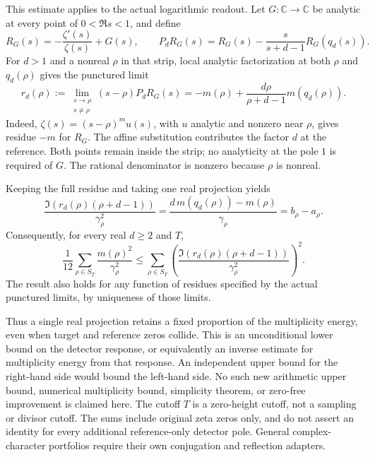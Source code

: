 This estimate applies to the actual logarithmic readout. Let
\(G:\mathbb C\to\mathbb C\) be analytic at every point of
\(0<\Re s<1\), and define
\[
 R_G(s)=-\frac{\zeta'(s)}{\zeta(s)}+G(s),\qquad
 P_dR_G(s)=R_G(s)-\frac{s}{s+d-1}R_G(q_d(s)).
\]
For \(d>1\) and a nonreal \(\rho\) in that strip, local analytic
factorization at both \(\rho\) and \(q_d(\rho)\) gives the punctured limit
\begin{equation}\label{eq:canonical-power-multiplicity-residue}
 r_d(\rho):=\lim_{\substack{s\to\rho\\s\ne\rho}}
                 (s-\rho)P_dR_G(s)
 =-m(\rho)+\frac{d\rho}{\rho+d-1}m(q_d(\rho)).
\end{equation}
Indeed, \(\zeta(s)=(s-\rho)^m u(s)\), with \(u\) analytic and
nonzero near \(\rho\), gives residue \(-m\) for \(R_G\).
The affine substitution contributes the factor \(d\) at the reference.
Both points remain inside the strip; no analyticity at the pole \(1\)
is required of \(G\). The rational denominator is nonzero because
\(\rho\) is nonreal.

Keeping the full residue and taking one real projection yields
\[
 \frac{\Im(r_d(\rho)(\rho+d-1))}{\gamma_\rho^2}
 =\frac{d\,m(q_d(\rho))-m(\rho)}{\gamma_\rho}
 =b_\rho-a_\rho.
\]
Consequently, for every real \(d\ge2\) and \(T\),
\begin{equation}\label{eq:actual-power-readout-energy}
 \frac1{12}\sum_{\rho\in S_T}\frac{m(\rho)^2}{\gamma_\rho^2}
 \le
 \sum_{\rho\in S_T}
 \left(\frac{\Im(r_d(\rho)(\rho+d-1))}{\gamma_\rho^2}\right)^2.
\end{equation}
The result also holds for any function of residues specified by the
actual punctured limits, by uniqueness of those limits.

Thus a single real projection retains a fixed proportion of the
multiplicity energy, even when target and reference zeros collide.
This is an unconditional lower bound on the detector response, or
equivalently an inverse estimate for multiplicity energy from that
response. An independent upper bound for the right-hand side would
bound the left-hand side. No such new arithmetic upper bound, numerical
multiplicity bound, simplicity theorem, or zero-free improvement is
claimed here. The cutoff \(T\) is a zero-height cutoff, not a sampling
or divisor cutoff. The sums include original zeta zeros only, and do
not assert an identity for every additional reference-only detector
pole. General complex-character portfolios require their own
conjugation and reflection adapters.


